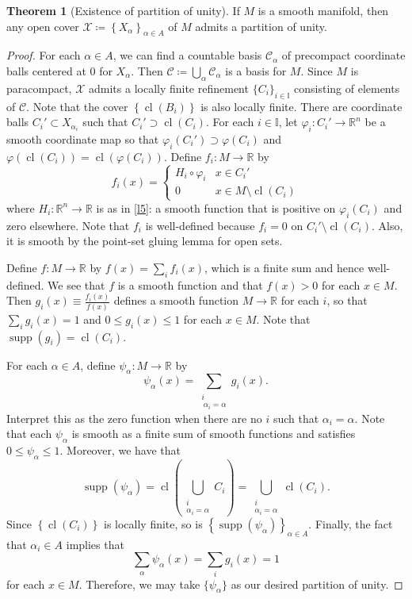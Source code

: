 \documentclass[10pt,letterpaper,cm]{nupset}
\theoremstyle{definition}
\theoremstyle{theorem}
\newtheorem{theorem}[definition]{Theorem}
\theoremstyle{remark}
\newcommand{\R}{\mathbb R}
\newcommand{\1}{\mathbf{1}}
\newcommand{\0}{\vec 0}
\DeclareMathOperator{\supp}{supp}
\DeclareMathOperator{\cl}{cl}
\begin{document}
\begin{theorem}[Existence of partition of unity]
If $M$ is a smooth manifold, then any open cover $\mathcal{X}\coloneqq \left\{X_{\alpha}\right\}_{\alpha \in A}$ of $M$ admits a partition of unity. 
\end{theorem}
\begin{proof}
For each $\alpha \in A$, we can find a countable basis $\mathcal{C}_{\alpha}$ of precompact  coordinate balls centered at $0$ for $X_{\alpha}$. Then $\mathcal{C}\coloneqq \bigcup_{\alpha} \mathcal{C}_{\alpha}$ is a basis for $M$. Since $M$ is paracompact, $\mathcal{X}$ admits a locally finite refinement $\{C_i\}_{i\in \mathbb{I}}$ consisting of elements of $\mathcal{C}$. Note that the cover $\left\{\cl(B_i)\right\}$ is also locally finite. There are coordinate balls $C_i' \subset X_{\alpha_i}$ such that $ C_i'\supset \cl(C_i)$. For each $i\in \mathbb{I}$, let $\varphi_i : C_i' \to \R^n$ be a smooth coordinate map so that $\varphi_i(C_i') \supset \varphi(C_i)$ and $\varphi(\cl(C_i)) = \cl\left(\varphi(C_i)\right)$. Define $f_i: M \to \R$ by $$f_i(x) = \begin{cases}  H_i \circ \varphi_i &   x\in C_i' \\ 0 & x \in M \setminus \cl(C_i)    \end{cases}      $$ where $H_i: \R^n \to \R$ is as in \cref{l5}: a smooth function that is positive on $\varphi_i(C_i)$ and zero elsewhere. Note that $f_i$ is well-defined because $f_i=0$ on $C_i' \setminus \cl(C_i)$. Also, it is smooth by the point-set gluing lemma for open sets. 

\medskip


Define $f: M \to \R$ by $f(x) = \sum_{i}f_i(x)$, which is a finite sum and hence well-defined. We see that $f$ is a smooth function and that $f(x) >0$ for each $x\in M$. Then $g_i(x) \equiv \frac{f_i(x)}{f(x)}$ defines a smooth function $M \to \R$ for each $i$, so that $\sum_i g_i(x) = 1$ and $0\leq g_i(x) \leq 1$ for each $x\in M$. Note that $\supp(g_i) = \cl(C_i)$. 

\medskip


For each $\alpha \in A$, define $\psi_{\alpha} : M \to \R$ by $$\psi_{\alpha}(x) = \sum_{\substack{i \\ \ \alpha_i=\alpha}}g_i(x)     .$$ Interpret this as the zero function when there are no $i$ such that $\alpha_i = \alpha$.  Note that each $\psi_{\alpha}$ is smooth as a finite sum of smooth functions and satisfies $0\leq  \psi_{\alpha} \leq 1$. Moreover, we have that $$\supp(\psi_{\alpha}) = \cl \left(\bigcup_{\substack{i \\ \alpha_i=\alpha}} C_i \right)= \bigcup_{\substack{i \\ \alpha_i=\alpha}} \cl(C_i). $$ Since $\left\{\cl(C_i)\right\}$ is locally finite, so is $\left\{\supp(\psi_{\alpha})\right\}_{\alpha \in A}$. Finally, the fact that $\alpha_i \in A$ implies that $$\sum_{\alpha} \psi_{\alpha}(x) = \sum_i g_i(x) =1$$ for each $x\in M$. Therefore, we may take $\{\psi_{\alpha}\}$ as our desired partition of unity. 
\end{proof}
\end{document}
